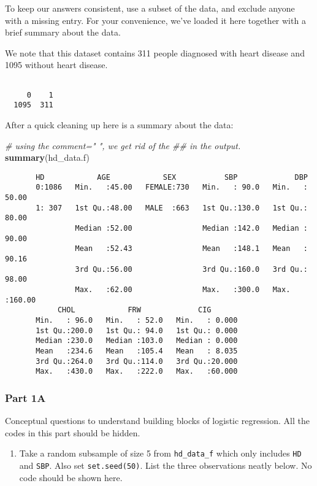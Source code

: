 \documentclass[]{article}
\newenvironment{Shaded}{\begin{snugshade}}{\end{snugshade}}
\newcommand{\KeywordTok}[1]{\textcolor[rgb]{0.13,0.29,0.53}{\textbf{#1}}}
\newcommand{\CommentTok}[1]{\textcolor[rgb]{0.56,0.35,0.01}{\textit{#1}}}
\newcommand{\NormalTok}[1]{#1}
\providecommand{\tightlist}{%
  \setlength{\itemsep}{0pt}\setlength{\parskip}{0pt}}
\begin{document}
To keep our answers consistent, use a subset of the data, and exclude
anyone with a missing entry. For your convenience, we've loaded it here
together with a brief summary about the data.

We note that this dataset contains 311 people diagnosed with heart
disease and 1095 without heart disease.

\begin{verbatim}
  
     0    1 
  1095  311
\end{verbatim}

After a quick cleaning up here is a summary about the data:

\begin{Shaded}
\begin{Highlighting}[]
\CommentTok{# using the comment="     ", we get rid of the ## in the output.}
\KeywordTok{summary}\NormalTok{(hd_data.f)}
\end{Highlighting}
\end{Shaded}

\begin{verbatim}
       HD            AGE            SEX           SBP             DBP        
       0:1086   Min.   :45.00   FEMALE:730   Min.   : 90.0   Min.   : 50.00  
       1: 307   1st Qu.:48.00   MALE  :663   1st Qu.:130.0   1st Qu.: 80.00  
                Median :52.00                Median :142.0   Median : 90.00  
                Mean   :52.43                Mean   :148.1   Mean   : 90.16  
                3rd Qu.:56.00                3rd Qu.:160.0   3rd Qu.: 98.00  
                Max.   :62.00                Max.   :300.0   Max.   :160.00  
            CHOL            FRW             CIG        
       Min.   : 96.0   Min.   : 52.0   Min.   : 0.000  
       1st Qu.:200.0   1st Qu.: 94.0   1st Qu.: 0.000  
       Median :230.0   Median :103.0   Median : 0.000  
       Mean   :234.6   Mean   :105.4   Mean   : 8.035  
       3rd Qu.:264.0   3rd Qu.:114.0   3rd Qu.:20.000  
       Max.   :430.0   Max.   :222.0   Max.   :60.000
\end{verbatim}

\subsubsection{Part 1A}\label{part-1a}

Conceptual questions to understand building blocks of logistic
regression. All the codes in this part should be hidden.

\begin{enumerate}
\def\labelenumi{\roman{enumi}.}
\tightlist
\item
  Take a random subsample of size 5 from \texttt{hd\_data\_f} which only
  includes \texttt{HD} and \texttt{SBP}. Also set \texttt{set.seed(50)}.
  List the three observations neatly below. No code should be shown
  here.
\end{enumerate}
\end{document}
